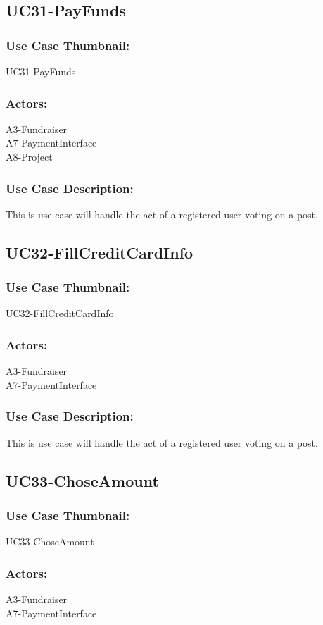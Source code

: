 \documentclass[11pt, openany]{report}
\begin{document}
\subsection{UC31-PayFunds}
\label{sUC31}
\subsubsection*{Use Case Thumbnail:}
UC31-PayFunds
\subsubsection*{Actors:}
A3-Fundraiser\\
A7-PaymentInterface\\
A8-Project
\subsubsection*{Use Case Description:}
This is use case will handle the act of a registered user voting on a post.

\subsection{UC32-FillCreditCardInfo}
\label{sUC32}
\subsubsection*{Use Case Thumbnail:}
UC32-FillCreditCardInfo
\subsubsection*{Actors:}
A3-Fundraiser\\
A7-PaymentInterface\\
\subsubsection*{Use Case Description:}
This is use case will handle the act of a registered user voting on a post.

\subsection{UC33-ChoseAmount}
\label{sUC33}
\subsubsection*{Use Case Thumbnail:}
UC33-ChoseAmount
\subsubsection*{Actors:}
A3-Fundraiser\\
A7-PaymentInterface\\
\end{document}
